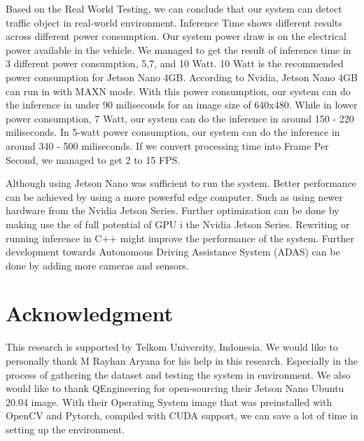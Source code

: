 \documentclass[conference]{IEEEtran}
\begin{document}
Based on the Real World Testing, we can conclude that our system can detect traffic object in real-world environment. Inference Time shows different results across different power consumption.
Our system power draw is  on the electrical power available in the vehicle. We managed to get the result of inference time in 3 different power consumption, 5,7, and 10 Watt.
10 Watt is the recommended power consumption for Jetson Nano 4GB. According to Nvidia, Jetson Nano 4GB can run in with MAXN mode. 
With this power consumption, our system can do the inference in under 90 miliseconds for an image size of 640x480.
While in lower power consumption, 7 Watt, our system can do the inference in around 150 - 220 miliseconds.
In 5-watt power consumption, our system can do the inference in around 340 - 500 miliseconds.
If we convert processing time into Frame Per Second, we managed to get 2 to 15 FPS.


Although using Jetson Nano was sufficient to run the system. Better performance can be achieved by using a more powerful edge computer. Such as using newer hardware from the Nvidia Jetson Series. Further optimization can be done by making use the of full potential of GPU i the Nvidia Jetson Series. Rewriting or running inference in C++ might improve the performance of the system.
Further development towards Autonomous Driving Assistance System (ADAS) can be done by adding more cameras and sensors.
\section*{Acknowledgment}
This research is supported by Telkom University, Indonesia.
We would like to personally thank M Rayhan Aryana for his help in this research.
Especially in the process of gathering the dataset and testing the system in   environment.
We also would like to thank QEngineering for open-sourcing their Jetson Nano Ubuntu 20.04 image. With their Operating System image that was preinstalled with OpenCV and Pytorch, compiled with CUDA support, we can save a lot of time in setting up the environment.
\end{document}
